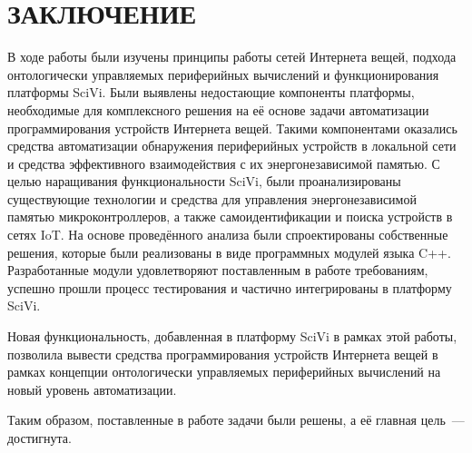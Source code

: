 \chapter*{ЗАКЛЮЧЕНИЕ}

В ходе работы были изучены принципы работы сетей Интернета вещей, подхода онтологически управляемых периферийных вычислений и функционирования платформы SciVi. Были выявлены недостающие компоненты платформы, необходимые для комплексного решения на её основе задачи автоматизации программирования устройств Интернета вещей. Такими компонентами оказались средства автоматизации обнаружения периферийных устройств в локальной сети и средства эффективного взаимодействия с их энергонезависимой памятью.
С целью наращивания функциональности SciVi, были проанализированы существующие технологии и средства для управления энергонезависимой памятью микроконтроллеров, а также самоидентификации и поиска устройств в сетях IoT.
На основе проведённого анализа были спроектированы собственные решения, которые были реализованы в виде программных модулей языка C++.
Разработанные модули удовлетворяют поставленным в работе требованиям, успешно прошли процесс тестирования и частично интегрированы в платформу SciVi. 

Новая функциональность, добавленная в платформу SciVi в рамках этой работы, позволила вывести средства программирования устройств Интернета вещей в рамках концепции онтологически управляемых периферийных вычислений на новый уровень автоматизации.

Таким образом, поставленные в работе задачи были решены, а её главная цель~--- достигнута.
